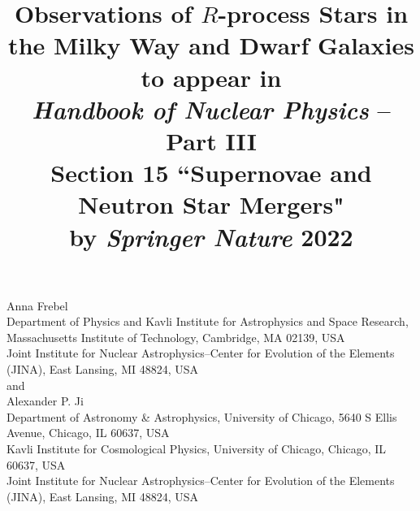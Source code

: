 \documentclass[letterpaper]{article}
\title{Observations of $R$-process Stars in the Milky Way and Dwarf Galaxies \\\vspace{0.3cm}
\large{to appear in \\
\textit{Handbook of Nuclear Physics} -- Part III \\
Section 15 ``Supernovae and Neutron Star Mergers"\\
by \textit{Springer Nature} 2022}
}
\author{}
\date{}
\begin{document}
\maketitle

\begin{center}
    
{\large Anna Frebel} \\
{\small Department of Physics and Kavli Institute for Astrophysics and Space Research, Massachusetts Institute of Technology, Cambridge, MA 02139, USA} \\ 
{\small Joint Institute for Nuclear Astrophysics--Center for Evolution of the Elements (JINA), East Lansing, MI 48824, USA} \\[12pt]
{\large and} \\[12pt]
{\large Alexander P. Ji} \\ 
{\small Department of Astronomy \& Astrophysics, University of Chicago, 5640 S Ellis Avenue, Chicago, IL 60637, USA} \\
{\small Kavli Institute for Cosmological Physics, University of Chicago, Chicago, IL 60637, USA} \\
{\small Joint Institute for Nuclear Astrophysics--Center for Evolution of the Elements (JINA), East Lansing, MI 48824, USA}
\end{center}
\end{document}
